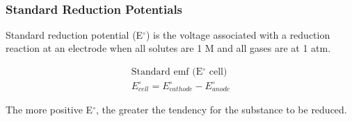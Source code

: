 \documentclass[11pt]{article}
\begin{document}
    \begin{center}
         \\
    \end{center}

    \subsubsection{Standard Reduction Potentials}
    Standard reduction potential (E$^\circ$) is the voltage associated with a reduction reaction at an electrode when all solutes are 1 M and all gases are at 1 atm.

    \begin{equation*}
        \begin{gathered}
            \text{Standard emf (E$^\circ$ cell)} \\
            E^\circ_{cell} = E^\circ_{cathode} - E^\circ_{anode}
        \end{gathered}
    \end{equation*}

    The more positive E$^\circ$, the greater the tendency for the substance to be reduced.
\end{document}
